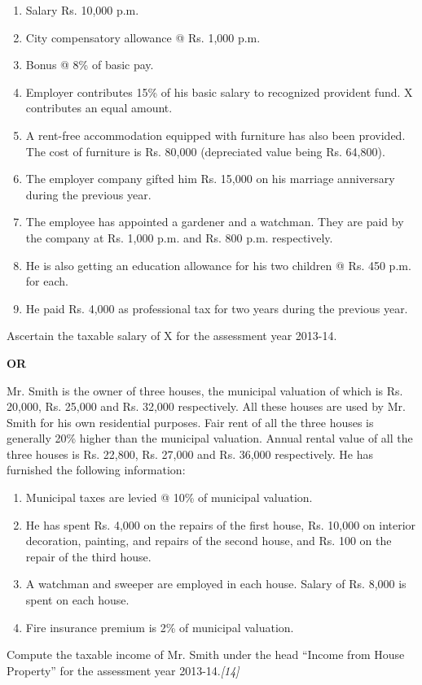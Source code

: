 \documentclass[11pt,a4paper]{article}
\newcommand{\pts}[1]{\hfill   \textit{[#1]}}
\begin{document}
\begin{enumerate}[label=(\roman*),itemsep=2pt,topsep=2pt]
  \item Salary Rs. 10,000 p.m.
  \item City compensatory allowance @ Rs. 1,000 p.m.
  \item Bonus @ 8\% of basic pay.
  \item Employer contributes 15\% of his basic salary to recognized provident fund. X contributes an equal amount.
  \item A rent-free accommodation equipped with furniture has also been provided. The cost of furniture is Rs. 80,000 (depreciated value being Rs. 64,800).
  \item The employer company gifted him Rs. 15,000 on his marriage anniversary during the previous year.
  \item The employee has appointed a gardener and a watchman. They are paid by the company at Rs. 1,000 p.m. and Rs. 800 p.m. respectively.
  \item He is also getting an education allowance for his two children @ Rs. 450 p.m. for each.
  \item He paid Rs. 4,000 as professional tax for two years during the previous year.
\end{enumerate}
Ascertain the taxable salary of X for the assessment year 2013-14.

\centerline{   \textbf{OR}}

Mr. Smith is the owner of three houses, the municipal valuation of which is Rs. 20,000, Rs. 25,000 and Rs. 32,000 respectively. All these houses are used by Mr. Smith for his own residential purposes. Fair rent of all the three houses is generally 20\% higher than the municipal valuation. Annual rental value of all the three houses is Rs. 22,800, Rs. 27,000 and Rs. 36,000 respectively. He has furnished the following information:

\begin{enumerate}[label=(\roman*),itemsep=2pt,topsep=2pt]
  \item Municipal taxes are levied @ 10\% of municipal valuation.
  \item He has spent Rs. 4,000 on the repairs of the first house, Rs. 10,000 on interior decoration, painting, and repairs of the second house, and Rs. 100 on the repair of the third house.
  \item A watchman and sweeper are employed in each house. Salary of Rs. 8,000 is spent on each house.
  \item Fire insurance premium is 2\% of municipal valuation.
\end{enumerate}
Compute the taxable income of Mr. Smith under the head ``Income from House Property'' for the assessment year 2013-14.\pts{14}
\end{document}
